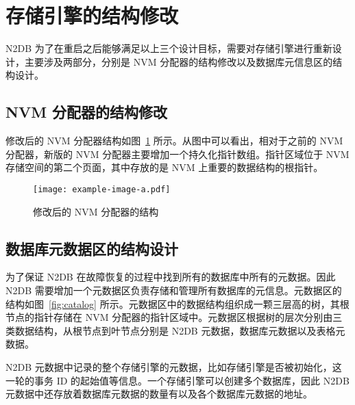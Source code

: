 \section{存储引擎的结构修改}

N2DB 为了在重启之后能够满足以上三个设计目标，需要对存储引擎进行重新设计，主要涉及两部分，分别是 NVM 分配器的结构修改以及数据库元信息区的结构设计。

\subsection{NVM 分配器的结构修改}
修改后的 NVM 分配器结构如图~\ref{fig:nvm-allocator} 所示。从图中可以看出，相对于之前的 NVM 分配器，新版的 NVM 分配器主要增加一个持久化指针数组。指针区域位于 NVM 存储空间的第二个页面，其中存放的是 NVM 上重要的数据结构的根指针。


\begin{figure}[ht]
    \centering
    \texttt{[image: example-image-a.pdf]}
    \caption{修改后的 NVM 分配器的结构}
    \label{fig:nvm-allocator}
\end{figure}

\subsection{数据库元数据区的结构设计}

为了保证 N2DB 在故障恢复的过程中找到所有的数据库中所有的元数据。因此 N2DB 需要增加一个元数据区负责存储和管理所有数据库的元信息。元数据区的结构如图~\ref{fig:catalog} 所示。元数据区中的数据结构组织成一颗三层高的树，其根节点的指针存储在 NVM 分配器的指针区域中。元数据区根据树的层次分别由三类数据结构，从根节点到叶节点分别是 N2DB 元数据，数据库元数据以及表格元数据。

N2DB 元数据中记录的整个存储引擎的元数据，比如存储引擎是否被初始化，这一轮的事务 ID 的起始值等信息。一个存储引擎可以创建多个数据库，因此 N2DB 元数据中还存放着数据库元数据的数量有以及各个数据库元数据的地址。

